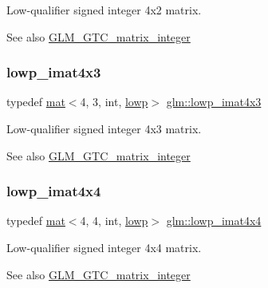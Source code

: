 Low-\/qualifier signed integer 4x2 matrix. \begin{DoxySeeAlso}{See also}
\hyperlink{group__gtc__matrix__integer}{G\+L\+M\+\_\+\+G\+T\+C\+\_\+matrix\+\_\+integer} 
\end{DoxySeeAlso}
\mbox{\label{group__gtc__matrix__integer_gad4b823d8b8ba89d8d6baa562ffb97751}} 
\subsubsection{\texorpdfstring{lowp\+\_\+imat4x3}{lowp\_imat4x3}}
{\footnotesize\ttfamily typedef \hyperlink{structglm_1_1mat}{mat}$<$4, 3, int, \hyperlink{namespaceglm_a36ed105b07c7746804d7fdc7cc90ff25ae161af3fc695e696ce3bf69f7332bc2d}{lowp}$>$ \hyperlink{group__gtc__matrix__integer_gad4b823d8b8ba89d8d6baa562ffb97751}{glm\+::lowp\+\_\+imat4x3}}

Low-\/qualifier signed integer 4x3 matrix. \begin{DoxySeeAlso}{See also}
\hyperlink{group__gtc__matrix__integer}{G\+L\+M\+\_\+\+G\+T\+C\+\_\+matrix\+\_\+integer} 
\end{DoxySeeAlso}
\mbox{\label{group__gtc__matrix__integer_ga788e6fa0d6ba756ae9fc758099c57f85}} 
\subsubsection{\texorpdfstring{lowp\+\_\+imat4x4}{lowp\_imat4x4}}
{\footnotesize\ttfamily typedef \hyperlink{structglm_1_1mat}{mat}$<$4, 4, int, \hyperlink{namespaceglm_a36ed105b07c7746804d7fdc7cc90ff25ae161af3fc695e696ce3bf69f7332bc2d}{lowp}$>$ \hyperlink{group__gtc__matrix__integer_ga788e6fa0d6ba756ae9fc758099c57f85}{glm\+::lowp\+\_\+imat4x4}}

Low-\/qualifier signed integer 4x4 matrix. \begin{DoxySeeAlso}{See also}
\hyperlink{group__gtc__matrix__integer}{G\+L\+M\+\_\+\+G\+T\+C\+\_\+matrix\+\_\+integer} 
\end{DoxySeeAlso}
\mbox{\label{group__gtc__matrix__integer_ga51cca2e9b98db6345e8c60b7d00c79cf}} 
